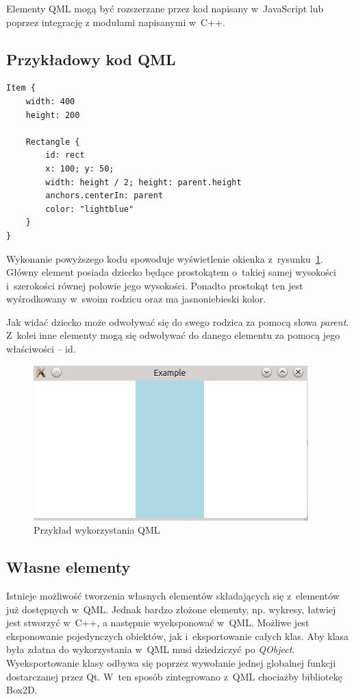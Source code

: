 Elementy QML mogą być rozszerzane przez kod napisany w~JavaScript lub poprzez integrację z modułami napisanymi w~C++.

\subsection{Przykładowy kod QML}

\lstset{
  captionpos=b,                           %
 }
\begin{lstlisting}[caption=Przykład QML, label=code:qml]
Item {
	width: 400
	height: 200

	Rectangle {
		id: rect
		x: 100; y: 50;
		width: height / 2; height: parent.height
		anchors.centerIn: parent
		color: "lightblue"
	}
}
\end{lstlisting}

Wykonanie powyższego kodu spowoduje wyświetlenie okienka z~rysunku~\ref{rys:qml}. Główny element posiada dziecko będące prostokątem o~takiej samej wysokości i~szerokości równej połowie jego wysokości. Ponadto prostokąt ten jest wyśrodkowany w~swoim rodzicu oraz ma jasnoniebieski kolor.

Jak widać dziecko może odwoływać się do swego rodzica za pomocą słowa \textit{parent}. Z~kolei inne elementy mogą się odwoływać do danego elementu za pomocą jego właściwości -- id.

\begin{figure}[H]
\centering
\includegraphics{img/qml.png}
\caption{Przykład wykorzystania QML}\label{rys:qml}
\end{figure}

\subsection{Własne elementy}
Istnieje możliwość tworzenia własnych elementów składających się z~elementów już dostępnych w~QML. Jednak bardzo złożone elementy, np. wykresy, łatwiej jest stworzyć w~C++, a następnie wyeksponować w~QML. Możliwe jest eksponowanie pojedynczych obiektów, jak i~eksportowanie całych klas. Aby klasa była zdatna do wykorzystania w~QML musi dziedziczyć po \textit{QObject}. Wyeksportowanie klasy odbywa się poprzez wywołanie jednej globalnej funkcji dostarczanej przez Qt. W~ten sposób zintegrowano z~QML chociażby bibliotekę Box2D.


